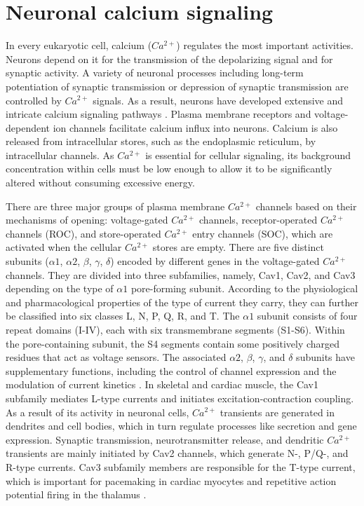 \section{Neuronal calcium signaling}
In every eukaryotic cell, calcium ($Ca^{2+}$) regulates the most important activities. Neurons depend on it for the transmission of the depolarizing signal and for synaptic activity. A variety of neuronal processes including long-term potentiation of synaptic transmission or depression of synaptic transmission are controlled by $Ca^{2+}$ signals. As a result, neurons have developed extensive and intricate calcium signaling pathways \parencite{Brini2014}. Plasma membrane receptors and voltage-dependent ion channels facilitate calcium influx into neurons. Calcium is also released from intracellular stores, such as the endoplasmic reticulum, by intracellular channels. As $Ca^{2+}$ is essential for cellular signaling, its background concentration within cells must be low enough to allow it to be significantly altered without consuming excessive energy. %

There are three major groups of plasma membrane $Ca^{2+}$ channels based on their mechanisms of opening: voltage-gated $Ca^{2+}$ channels, receptor-operated $Ca^{2+}$ channels (ROC), and store-operated $Ca^{2+}$ entry channels (SOC), which are activated when the cellular $Ca^{2+}$ stores are empty. There are five distinct subunits ($\alpha 1$, $\alpha 2$, $\beta$, $\gamma$, $\delta$) encoded by different genes in the voltage-gated $Ca^{2+}$ channels. They are divided into three subfamilies, namely, Cav1, Cav2, and Cav3 depending on the type of $\alpha 1$ pore-forming subunit. According to the physiological and pharmacological properties of the type of current they carry, they can further be classified into six classes L, N, P, Q, R, and T. The $\alpha 1$ subunit consists of four repeat domains (I-IV), each with six transmembrane segments (S1-S6). Within the pore-containing subunit, the S4 segments contain some positively charged residues that act as voltage sensors. The associated $\alpha 2$, $\beta$, $\gamma$, and $\delta$ subunits have supplementary functions, including the control of channel expression and the modulation of current kinetics \parencite{Hofmann1999, Catterall2000}. In skeletal and cardiac muscle, the Cav1 subfamily mediates L-type currents and initiates excitation-contraction coupling. As a result of its activity in neuronal cells, $Ca^{2+}$ transients are generated in dendrites and cell bodies, which in turn regulate processes like secretion and gene expression. Synaptic transmission, neurotransmitter release, and dendritic $Ca^{2+}$ transients are mainly initiated by Cav2 channels, which generate N-, P/Q-, and R-type currents. Cav3 subfamily members are responsible for the T-type current, which is important for pacemaking in cardiac myocytes and repetitive action potential firing in the thalamus \parencite{Catterall2011}.

